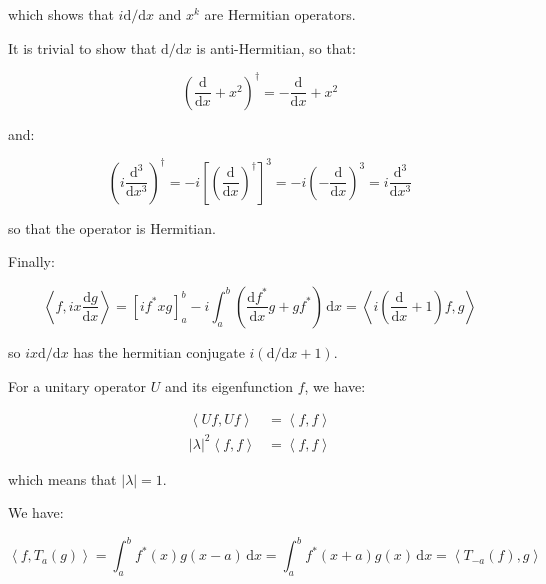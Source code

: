 \documentclass[12pt]{article}
\begin{document}
which shows that $i \mathrm{d}/\mathrm{d}x$ and $x^{k}$ are Hermitian operators.

It is trivial to show that $\mathrm{d}/\mathrm{d}x$ is anti-Hermitian, so that:

\begin{equation}
    \left( \frac{\mathrm{d}}{\mathrm{d}x} + x^{2} \right)^{\dagger} = -\frac{\mathrm{d}}{\mathrm{d}x} + x^{2}
\end{equation}

and:

\begin{equation}
    \left( i \frac{\mathrm{d}^{3}}{\mathrm{d}x^{3}} \right)^{\dagger} = -i \left[ \left( \frac{\mathrm{d}}{\mathrm{d}x} \right)^{\dagger} \right]^{3} = -i \left( -\frac{\mathrm{d}}{\mathrm{d}x} \right)^{3} = i \frac{\mathrm{d}^{3}}{\mathrm{d}x^{3}}
\end{equation}

so that the operator is Hermitian.

Finally:

\begin{equation}
    \left\langle f, ix \frac{\mathrm{d}g}{\mathrm{d}x} \right\rangle = \left[ i f^{*} x g \right]_{a}^{b} - i\int_{a}^{b} \left( \frac{\mathrm{d}f^{*}}{\mathrm{d}x} g + g f^{*} \right) \, \mathrm{d}x = \left\langle i \left( \frac{\mathrm{d}}{\mathrm{d}x} + 1 \right) f, g \right\rangle
\end{equation}

so $i x \mathrm{d}/\mathrm{d}x$ has the hermitian conjugate $i (\mathrm{d}/\mathrm{d}x + 1)$.

For a unitary operator $U$ and its eigenfunction $f$, we have:

\begin{equation}
\begin{split}
    \left\langle Uf, Uf \right\rangle &= \left\langle f, f \right\rangle \\
    \left\lvert \lambda \right\rvert^{2} \left\langle f, f \right\rangle &= \left\langle f, f \right\rangle
\end{split}
\end{equation}

which means that $\left\lvert \lambda \right\rvert = 1$.

We have:

\begin{equation}
    \left\langle f, T_{a}(g) \right\rangle = \int_{a}^{b} f^{*}(x) g(x - a) \, \mathrm{d}x = \int_{a}^{b} f^{*}(x + a) g(x) \, \mathrm{d}x = \left\langle T_{-a}(f), g \right\rangle
\end{equation}
\end{document}
